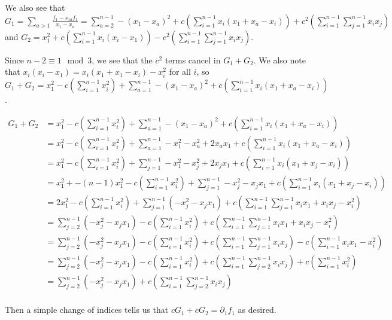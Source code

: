 \documentclass{article}
\numberwithin{equation}{section}
\begin{document}
We also see that $G_1= \sum_{a > 1} \frac{f_1-s_{1a}f_1}{x_1-x_a} = \sum_{a=2}^{n-1} -(x_1-x_a)^2+c \left(\sum_{i=1}^{n-1} x_i(x_1+x_a-x_i)\right)+c^2 \left(\sum_{i=1}^{n-1} \sum_{j=1}^{n-1} x_ix_j\right)$ and $G_2=x_1^2+c \left(\sum_{i=1}^{n-1} x_i(x_i-x_1)\right)-c^2 \left(\sum_{i=1}^{n-1} \sum_{j=1}^{n-1} x_ix_j\right)$.

Since $n-2 \equiv 1 \mod 3$, we see that the $c^2$ terms cancel in $G_1+G_2$. We also note that $x_i(x_i-x_1)=x_i(x_1+x_1-x_i)-x_i^2$ for all $i$, so $G_1+G_2= x_1^2-c\left(\sum_{i=1}^{n-1} x_i^2\right)+\sum_{a=1}^{n-1} -(x_1-x_a)^2+c \left(\sum_{i=1}^{n-1} x_i(x_1+x_a-x_i)\right)$.

\begin{align*}
G_1+G_2&= x_1^2-c\left(\sum_{i=1}^{n-1} x_i^2\right)+\sum_{a=1}^{n-1} -(x_1-x_a)^2+c \left(\sum_{i=1}^{n-1} x_i(x_1+x_a-x_i)\right)\\
&= x_1^2-c\left(\sum_{i=1}^{n-1} x_i^2\right)+\sum_{a=1}^{n-1} -x_1^2-x_a^2+2x_ax_1+c \left(\sum_{i=1}^{n-1} x_i(x_1+x_a-x_i)\right)\\
&= x_1^2-c\left(\sum_{i=1}^{n-1} x_i^2\right)+\sum_{j=1}^{n-1} -x_1^2-x_j^2+2x_jx_1+c \left(\sum_{i=1}^{n-1} x_i(x_1+x_j-x_i)\right)\\
&= x_1^2+-(n-1)x_1^2-c\left(\sum_{i=1}^{n-1} x_i^2\right)+\sum_{j=1}^{n-1} -x_j^2-x_jx_1+c \left(\sum_{i=1}^{n-1} x_i(x_1+x_j-x_i)\right)\\
&= 2x_1^2-c\left(\sum_{i=1}^{n-1} x_i^2\right)+\sum_{j=1}^{n-1} \left(-x_j^2-x_jx_1\right)+c \left(\sum_{i=1}^{n-1} \sum_{j=1}^{n-1} x_ix_1+x_ix_j-x_i^2\right)\\
&= \sum_{j=2}^{n-1} \left(-x_j^2-x_jx_1\right)-c\left(\sum_{i=1}^{n-1} x_i^2\right)+c \left(\sum_{i=1}^{n-1} \sum_{j=1}^{n-1} x_ix_1+x_ix_j-x_i^2\right)\\
&= \sum_{j=2}^{n-1} \left(-x_j^2-x_jx_1\right)-c\left(\sum_{i=1}^{n-1} x_i^2\right)+c \left(\sum_{i=1}^{n-1} \sum_{j=1}^{n-1}x_ix_j\right)-c \left(\sum_{i=1}^{n-1} x_ix_1-x_i^2\right)\\
&= \sum_{j=2}^{n-1} \left(-x_j^2-x_jx_1\right)-c\left(\sum_{i=1}^{n-1} x_i^2\right)+c \left(\sum_{i=1}^{n-1} \sum_{j=2}^{n-1}x_ix_j\right)+c \left(\sum_{i=1}^{n-1} x_i^2\right)\\
&= \sum_{j=2}^{n-1} \left(-x_j^2-x_jx_1\right)+c \left(\sum_{i=1}^{n-1} \sum_{j=2}^{n-1}x_ix_j\right)\\
\end{align*}

Then a simple change of indices tells us that $cG_1+cG_2=\partial_1f_1$ as desired.
\end{document}
